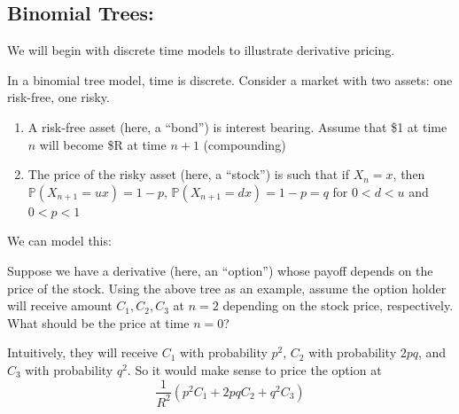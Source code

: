 \documentclass[12pt]{report}
\renewcommand{\P}{\mathbb{P}}
\begin{document}
\subsection*{Binomial Trees:} 
    We will begin with discrete time models to illustrate derivative pricing.

    In a binomial tree model, time is discrete. Consider a market with two assets: one risk-free, one risky. 
    \begin{enumerate}
        \item A risk-free asset (here, a ``bond'') is interest bearing. Assume that \$1 at time $n$ will become \$R at time $n +1$ (compounding)
        \item The price of the risky asset (here, a ``stock'') is such that if $X_n = x$, then $\P(X_{n+1} = ux) = 1 - p$, $\P(X_{n+1} = dx) = 1 - p = q$ for $0 < d < u$ and $0 < p < 1$
    \end{enumerate}

    We can model this:
    \begin{center}
    \end{center}

    Suppose we have a derivative (here, an ``option'') whose payoff depends on the price of the stock. Using the above tree as an example, assume the option holder will receive amount $C_1, C_2, C_3$ at $n = 2$ depending on the stock price, respectively. What should be the price at time $n= 0$? 

    Intuitively, they will receive $C_1$ with probability $p^2$, $C_2$ with probability $2pq$, and $C_3$ with probability $q^2$. So it would make sense to price the option at 
    \[\frac{1}{R^2}(p^2C_1 + 2pq C_2 + q^2 C_3)\]
\end{document}
